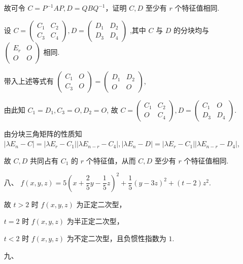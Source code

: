 \documentclass{ctexbook}
\begin{document}
\begin{enumerate}
    故可令 \(C=P^{-1}AP,D=QBQ^{-1}\)，证明 \(C,D\) 至少有 \(r\) 个特征值相同.\par
    设 \(C=\begin{pmatrix}
        C_1 & C_2\\
        C_3 & C_4
        \end{pmatrix},
        D=\begin{pmatrix}
        D_1 & D_2\\
        D_3 & D_4
        \end{pmatrix}\) ,其中 \(C\) 与 \(D\) 的分块均与 \(\begin{pmatrix}E_r & O\\O & O\end{pmatrix}\) 相同.\par
        带入上述等式有 \(\begin{pmatrix}
            C_1 & O\\
            C_3 & O
            \end{pmatrix}=
            \begin{pmatrix}
            D_1 & D_2\\
            O & O
            \end{pmatrix}\),\par
        由此知 \(C_1=D_1,C_3=O,D_2=O\), 故 
        \(C=\begin{pmatrix}
        C_1 & C_2\\
        O & C_4
        \end{pmatrix},
        D=\begin{pmatrix}
        C_1 & O\\
        D_3 & D_4
        \end{pmatrix}\).\par
        由分块三角矩阵的性质知 \(|\lambda E_n-C|=|\lambda E_r-C_1||\lambda E_{n-r}-C_4|,|\lambda E_n-D|=|\lambda E_r-C_1||\lambda E_{n-r}-D_4|\),\par
        故 \(C,D\) 共同占有 \(C_1\) 的 \(r\) 个特征值，从而 \(C,D\) 至少有 \(r\) 个特征值相同.
    \item[八、] \(f(x,y,z)=5(x+\dfrac{2}{5}y-\dfrac15 z)^2+\dfrac15(y-3z)^2+(t-2)z^2\).\par
    故 \(t>2\) 时 \(f(x,y,z)\) 为正定二次型，\par
    \(t=2\) 时 \(f(x,y,z)\) 为半正定二次型，\par
    \(t<2\) 时 \(f(x,y,z)\) 为不定二次型，且负惯性指数为 \(1\).
    \item[九、]
    \begin{enumerate}

\end{enumerate}
\end{enumerate}
\end{document}
